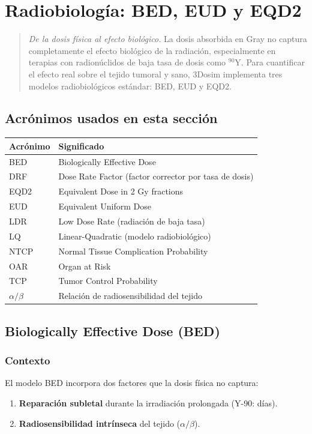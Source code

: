 \documentclass[12pt,a4paper]{article}
\begin{document}
\section{Radiobiología: BED, EUD y EQD2}

\begin{quote}
\textit{De la dosis física al efecto biológico.} La dosis absorbida en Gray no captura completamente el efecto biológico de la radiación, especialmente en terapias con radionúclidos de baja tasa de dosis como $^{90}$Y. Para cuantificar el efecto real sobre el tejido tumoral y sano, 3Dosim implementa tres modelos radiobiológicos estándar: BED, EUD y EQD2.
\end{quote}

\subsection*{Acrónimos usados en esta sección}

\begin{tabular}{p{3cm} p{12cm}}
\toprule
\textbf{Acrónimo} & \textbf{Significado} \\
\midrule
BED & Biologically Effective Dose \\
DRF & Dose Rate Factor (factor corrector por tasa de dosis) \\
EQD2 & Equivalent Dose in 2 Gy fractions \\
EUD & Equivalent Uniform Dose \\
LDR & Low Dose Rate (radiación de baja tasa) \\
LQ & Linear-Quadratic (modelo radiobiológico) \\
NTCP & Normal Tissue Complication Probability \\
OAR & Organ at Risk \\
TCP & Tumor Control Probability \\
$\alpha/\beta$ & Relación de radiosensibilidad del tejido \\
\bottomrule
\end{tabular}

\subsection{Biologically Effective Dose (BED)}

\subsubsection{Contexto}

El modelo BED incorpora dos factores que la dosis física no captura:
\begin{enumerate}
  \item \textbf{Reparación subletal} durante la irradiación prolongada (Y-90: días).
  \item \textbf{Radiosensibilidad intrínseca} del tejido ($\alpha/\beta$).
\end{enumerate}
\end{document}
